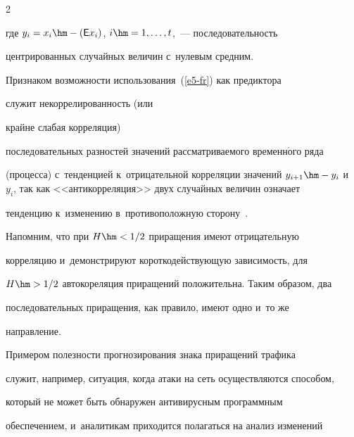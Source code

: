 \begin{multicols}{2}
\begin{equation}
  \label{e5-fr}


  \end{equation}


  


   \vspace*{-4pt}


  


  \noindent


где $y_i = x_i \hm- ({\sf E}x_i)$, $i\hm= 1, \ldots, t$,~--- последовательность 


центрированных случайных величин с~нулевым средним.





  Признаком возможности использования~(\ref{e5-fr}) как предиктора 


служит некоррелированность (или\linebreak


 крайне слабая корреляция) 


последовательных разностей значений рассматриваемого временн$\acute{\mbox{о}}$го ряда 


(процесса) с~тенденцией к~отрицательной корреляции значений $y_{i+1}\hm- 


y_i$ и~$y_i$, так как \mbox{<<антикорреляция>>} двух случайных величин означает 


тенденцию к~изменению в~противоположную сторону~\cite{16-fr}.


  


  Напомним, что при $H \hm<1/2$ приращения имеют отрицательную 


корреляцию и~демонстрируют короткодействующую зависимость, для 


$H\hm>1/2$ автокореляция приращений положительна. Таким образом, два 


последовательных приращения, как правило, имеют одно и~то же 


направление.


  


  Примером полезности прогнозирования знака приращений трафика 


служит, например, ситуация, когда атаки на сеть осуществляются способом, 


который не может быть обнаружен антивирусным программным 


обеспечением, и~аналитикам приходится полагаться на анализ изменений 



\end{multicols}
